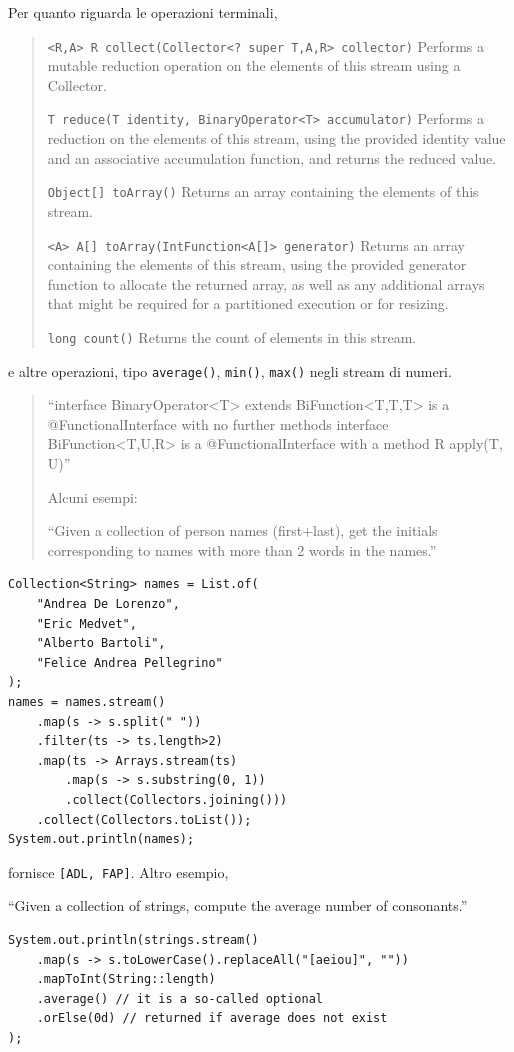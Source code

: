 \documentclass[\fontsizeclass,twocolumn]{\classname}
\theoremstyle{definition}
\theoremstyle{definition}
\begin{document}
Per quanto riguarda le operazioni terminali,
\begin{quote}
    \footnotesize{\texttt{<R,A> R 	collect(Collector<? super T,A,R> collector)} 	Performs a mutable reduction operation on the elements of this stream using a Collector.

\texttt{T 	reduce(T identity, BinaryOperator<T> accumulator)} 	Performs a reduction on the elements of this stream, using the provided identity value and an associative accumulation function, and returns the reduced value.

\texttt{Object[] 	toArray()} 	Returns an array containing the elements of this stream.

\texttt{<A> A[] 	toArray(IntFunction<A[]> generator)} 	Returns an array containing the elements of this stream, using the provided generator function to allocate the returned array, as well as any additional arrays that might be required for a partitioned execution or for resizing.

\texttt{long 	count()} 	Returns the count of elements in this stream.}
\end{quote}

e altre operazioni, tipo \texttt{average()}, \texttt{min()}, \texttt{max()}
negli stream di numeri.

\begin{quote}
    \footnotesize{
``interface BinaryOperator<T> extends BiFunction<T,T,T> is a @FunctionalInterface with no further methods
    interface BiFunction<T,U,R> is a @FunctionalInterface with a method R apply(T, U)''

Alcuni esempi:

``Given a collection of person names (first+last), get the initials
corresponding to names with more than 2 words in the names.''
}\end{quote}

\begin{lstlisting}
Collection<String> names = List.of(
    "Andrea De Lorenzo",
    "Eric Medvet",
    "Alberto Bartoli",
    "Felice Andrea Pellegrino"
);
names = names.stream()
    .map(s -> s.split(" "))
    .filter(ts -> ts.length>2)
    .map(ts -> Arrays.stream(ts)
        .map(s -> s.substring(0, 1))
        .collect(Collectors.joining()))
    .collect(Collectors.toList());
System.out.println(names);
\end{lstlisting}

fornisce \texttt{[ADL, FAP]}. Altro esempio,

``Given a collection of strings, compute the average number of consonants.''

\begin{lstlisting}
System.out.println(strings.stream()
    .map(s -> s.toLowerCase().replaceAll("[aeiou]", ""))
    .mapToInt(String::length)
    .average() // it is a so-called optional
    .orElse(0d) // returned if average does not exist
);
\end{lstlisting}
\end{document}
